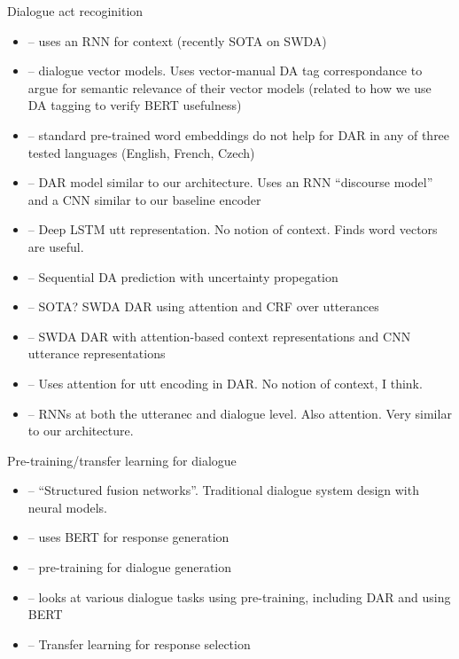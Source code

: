 \documentclass[11pt,a4paper]{article}
\begin{document}
Dialogue act recoginition
\begin{itemize}
  \item \citet{botheContextbasedApproachDialogue2018} -- uses an RNN for context (recently SOTA on SWDA)
  \item \citet{pragstVectorRepresentationUtterances2018} -- dialogue vector models. Uses vector-manual DA tag correspondance to argue for semantic relevance of their vector models (related to how we use DA tagging to verify BERT usefulness)
  \item \citet{cerisaraEffectsUsingWord2vec2017} -- standard pre-trained word embeddings do not help for DAR in any of three tested languages (English, French, Czech)
  \item \citet{kalchbrennerRecurrentConvolutionalNeural2013} -- DAR model similar to our architecture. Uses an RNN ``discourse model'' and a CNN similar to our baseline encoder
  \item \citet{khanpourDialogueActClassification2016} -- Deep LSTM utt representation. No notion of context. Finds word vectors are useful.
  \item \citet{tranPreservingDistributionalInformation2017} -- Sequential DA prediction with uncertainty propegation
  \item \citet{chenDialogueActRecognition2017} -- SOTA? SWDA DAR using attention and CRF over utterances
  \item \citet{ortegaNeuralbasedContextRepresentation2017} -- SWDA DAR with attention-based context representations and CNN utterance representations
  \item \citet{shenNeuralAttentionModels2016} -- Uses attention for utt encoding in DAR. No notion of context, I think.
  \item \citet{tranHierarchicalNeuralModel2017} -- RNNs at both the utteranec and dialogue level. Also attention. Very similar to our architecture.
\end{itemize}

Pre-training/transfer learning for dialogue
\begin{itemize}
  \item \citet{mehriStructuredFusionNetworks2019} -- ``Structured fusion networks''. Traditional dialogue system design with neural models.
  \item \citet{chenSemanticallyConditionedDialog2019a} -- uses BERT for response generation
  \item \citet{baoPLATOPretrainedDialogue2019} -- pre-training for dialogue generation
  \item \citet{mehriPretrainingMethodsDialog2019} -- looks at various dialogue tasks using pre-training, including DAR and using BERT
  \item \citet{vigComparisonTransferLearningApproaches} -- Transfer learning for response selection
\end{itemize}
\end{document}
